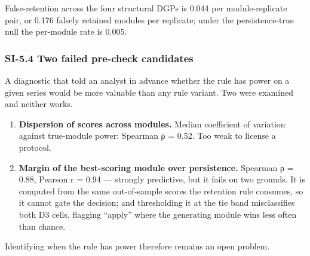 \documentclass[11pt]{article}
\providecommand{\tightlist}{\setlength{\itemsep}{0.2em}\setlength{\parskip}{0pt}}
\begin{document}
False-retention across the four structural DGPs is 0.044 per
module-replicate pair, or 0.176 falsely retained modules per replicate;
under the persistence-true null the per-module rate is 0.005.

\subsubsection{SI-5.4 Two failed pre-check
candidates}\label{si-5.4-two-failed-pre-check-candidates}

A diagnostic that told an analyst in advance whether the rule has power
on a given series would be more valuable than any rule variant. Two were
examined and neither works.

\begin{enumerate}
\def\labelenumi{\arabic{enumi}.}
\tightlist
\item
  \textbf{Dispersion of scores across modules.} Median coefficient of
  variation against true-module power: Spearman ρ = 0.52. Too weak to
  license a protocol.
\item
  \textbf{Margin of the best-scoring module over persistence.} Spearman
  ρ = 0.88, Pearson r = 0.94 --- strongly predictive, but it fails on
  two grounds. It is computed from the same out-of-sample scores the
  retention rule consumes, so it cannot gate the decision; and
  thresholding it at the tie band misclassifies both D3 cells, flagging
  ``apply'' where the generating module wins less often than chance.
\end{enumerate}

Identifying when the rule has power therefore remains an open problem.
\end{document}
